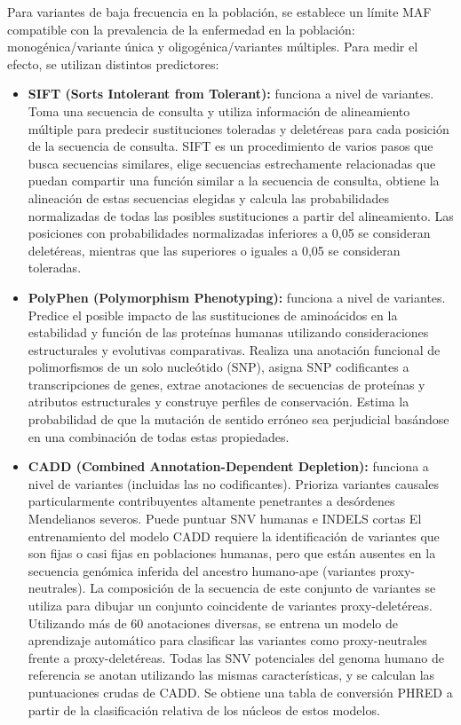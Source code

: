 Para variantes de baja frecuencia en la población, se establece un límite MAF compatible con la prevalencia de la enfermedad en la población: monogénica/variante única y oligogénica/variantes múltiples. Para medir el efecto, se utilizan distintos predictores:
\begin{itemize}
\item \textbf{SIFT (Sorts Intolerant from Tolerant):} funciona a nivel de variantes. Toma una secuencia de consulta y utiliza información de alineamiento múltiple para predecir sustituciones toleradas y deletéreas para cada posición de la secuencia de consulta. SIFT es un procedimiento de varios pasos que busca secuencias similares, elige secuencias estrechamente relacionadas que puedan compartir una función similar a la secuencia de consulta, obtiene la alineación de estas secuencias elegidas y calcula las probabilidades normalizadas de todas las posibles sustituciones a partir del alineamiento. Las posiciones con probabilidades normalizadas inferiores a 0,05 se consideran deletéreas, mientras que las superiores o iguales a 0,05 se consideran toleradas.
\item \textbf{PolyPhen (Polymorphism Phenotyping):} funciona a nivel de variantes. Predice el posible impacto de las sustituciones de aminoácidos en la estabilidad y función de las proteínas humanas utilizando consideraciones estructurales y evolutivas comparativas. Realiza una anotación funcional de polimorfismos de un solo nucleótido (SNP), asigna SNP codificantes a transcripciones de genes, extrae anotaciones de secuencias de proteínas y atributos estructurales y construye perfiles de conservación. Estima la probabilidad de que la mutación de sentido erróneo sea perjudicial basándose en una combinación de todas estas propiedades.
\item \textbf{CADD (Combined Annotation-Dependent Depletion):} funciona a nivel de variantes (incluidas las no codificantes). Prioriza variantes causales particularmente contribuyentes altamente penetrantes a desórdenes Mendelianos severos. Puede puntuar SNV humanas e INDELS cortas El entrenamiento del modelo CADD requiere la identificación de variantes que son fijas o casi fijas en poblaciones humanas, pero que están ausentes en la secuencia genómica inferida del ancestro humano-ape (variantes proxy-neutrales). La composición de la secuencia de este conjunto de variantes se utiliza para dibujar un conjunto coincidente de variantes proxy-deletéreas. Utilizando más de 60 anotaciones diversas, se entrena un modelo de aprendizaje automático para clasificar las variantes como proxy-neutrales frente a proxy-deletéreas. Todas las SNV potenciales del genoma humano de referencia se anotan utilizando las mismas características, y se calculan las puntuaciones crudas de CADD. Se obtiene una tabla de conversión PHRED a partir de la clasificación relativa de los núcleos de estos modelos.


\end{itemize}

